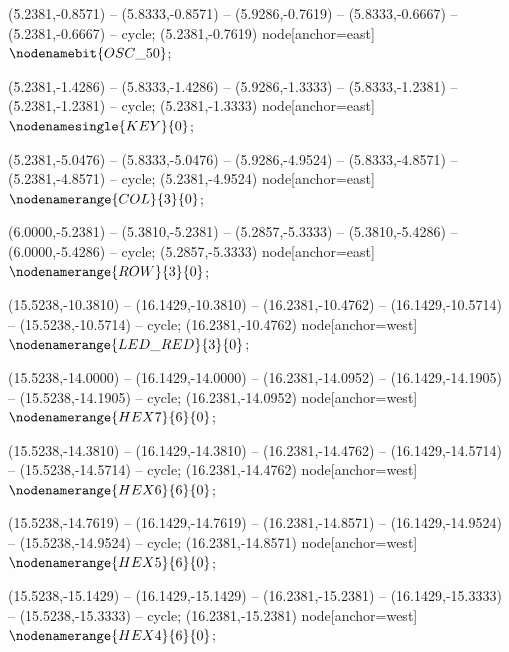    (5.2381,-0.8571) -- (5.8333,-0.8571) -- (5.9286,-0.7619) -- (5.8333,-0.6667) -- (5.2381,-0.6667) -- cycle;
   (5.2381,-0.7619) node[anchor=east] {$\nodenamebit{OSC\_50}$};

   (5.2381,-1.4286) -- (5.8333,-1.4286) -- (5.9286,-1.3333) -- (5.8333,-1.2381) -- (5.2381,-1.2381) -- cycle;
   (5.2381,-1.3333) node[anchor=east] {$\nodenamesingle{KEY}{0}$};

   (5.2381,-5.0476) -- (5.8333,-5.0476) -- (5.9286,-4.9524) -- (5.8333,-4.8571) -- (5.2381,-4.8571) -- cycle;
   (5.2381,-4.9524) node[anchor=east] {$\nodenamerange{COL}{3}{0}$};

   (6.0000,-5.2381) -- (5.3810,-5.2381) -- (5.2857,-5.3333) -- (5.3810,-5.4286) -- (6.0000,-5.4286) -- cycle;
   (5.2857,-5.3333) node[anchor=east] {$\nodenamerange{ROW}{3}{0}$};

   (15.5238,-10.3810) -- (16.1429,-10.3810) -- (16.2381,-10.4762) -- (16.1429,-10.5714) -- (15.5238,-10.5714) -- cycle;
   (16.2381,-10.4762) node[anchor=west] {$\nodenamerange{LED\_RED}{3}{0}$};

   (15.5238,-14.0000) -- (16.1429,-14.0000) -- (16.2381,-14.0952) -- (16.1429,-14.1905) -- (15.5238,-14.1905) -- cycle;
   (16.2381,-14.0952) node[anchor=west] {$\nodenamerange{HEX7}{6}{0}$};

   (15.5238,-14.3810) -- (16.1429,-14.3810) -- (16.2381,-14.4762) -- (16.1429,-14.5714) -- (15.5238,-14.5714) -- cycle;
   (16.2381,-14.4762) node[anchor=west] {$\nodenamerange{HEX6}{6}{0}$};

   (15.5238,-14.7619) -- (16.1429,-14.7619) -- (16.2381,-14.8571) -- (16.1429,-14.9524) -- (15.5238,-14.9524) -- cycle;
   (16.2381,-14.8571) node[anchor=west] {$\nodenamerange{HEX5}{6}{0}$};

   (15.5238,-15.1429) -- (16.1429,-15.1429) -- (16.2381,-15.2381) -- (16.1429,-15.3333) -- (15.5238,-15.3333) -- cycle;
   (16.2381,-15.2381) node[anchor=west] {$\nodenamerange{HEX4}{6}{0}$};

